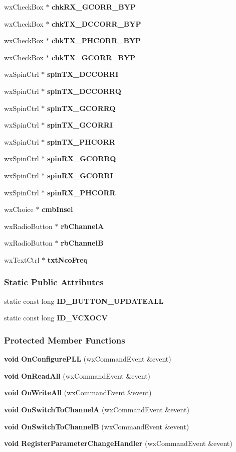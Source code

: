 \begin{DoxyCompactItemize}
\item 
wx\+Check\+Box $\ast$ {\bf chk\+R\+X\+\_\+\+G\+C\+O\+R\+R\+\_\+\+B\+YP}
\item 
wx\+Check\+Box $\ast$ {\bf chk\+T\+X\+\_\+\+D\+C\+C\+O\+R\+R\+\_\+\+B\+YP}
\item 
wx\+Check\+Box $\ast$ {\bf chk\+T\+X\+\_\+\+P\+H\+C\+O\+R\+R\+\_\+\+B\+YP}
\item 
wx\+Check\+Box $\ast$ {\bf chk\+T\+X\+\_\+\+G\+C\+O\+R\+R\+\_\+\+B\+YP}
\item 
wx\+Spin\+Ctrl $\ast$ {\bf spin\+T\+X\+\_\+\+D\+C\+C\+O\+R\+RI}
\item 
wx\+Spin\+Ctrl $\ast$ {\bf spin\+T\+X\+\_\+\+D\+C\+C\+O\+R\+RQ}
\item 
wx\+Spin\+Ctrl $\ast$ {\bf spin\+T\+X\+\_\+\+G\+C\+O\+R\+RQ}
\item 
wx\+Spin\+Ctrl $\ast$ {\bf spin\+T\+X\+\_\+\+G\+C\+O\+R\+RI}
\item 
wx\+Spin\+Ctrl $\ast$ {\bf spin\+T\+X\+\_\+\+P\+H\+C\+O\+RR}
\item 
wx\+Spin\+Ctrl $\ast$ {\bf spin\+R\+X\+\_\+\+G\+C\+O\+R\+RQ}
\item 
wx\+Spin\+Ctrl $\ast$ {\bf spin\+R\+X\+\_\+\+G\+C\+O\+R\+RI}
\item 
wx\+Spin\+Ctrl $\ast$ {\bf spin\+R\+X\+\_\+\+P\+H\+C\+O\+RR}
\item 
wx\+Choice $\ast$ {\bf cmb\+Insel}
\item 
wx\+Radio\+Button $\ast$ {\bf rb\+ChannelA}
\item 
wx\+Radio\+Button $\ast$ {\bf rb\+ChannelB}
\item 
wx\+Text\+Ctrl $\ast$ {\bf txt\+Nco\+Freq}
\end{DoxyCompactItemize}
\subsubsection*{Static Public Attributes}
\begin{DoxyCompactItemize}
\item 
static const long {\bf I\+D\+\_\+\+B\+U\+T\+T\+O\+N\+\_\+\+U\+P\+D\+A\+T\+E\+A\+LL}
\item 
static const long {\bf I\+D\+\_\+\+V\+C\+X\+O\+CV}
\end{DoxyCompactItemize}
\subsubsection*{Protected Member Functions}
\begin{DoxyCompactItemize}
\item 
{\bf void} {\bf On\+Configure\+P\+LL} (wx\+Command\+Event \&event)
\item 
{\bf void} {\bf On\+Read\+All} (wx\+Command\+Event \&event)
\item 
{\bf void} {\bf On\+Write\+All} (wx\+Command\+Event \&event)
\item 
{\bf void} {\bf On\+Switch\+To\+ChannelA} (wx\+Command\+Event \&event)
\item 
{\bf void} {\bf On\+Switch\+To\+ChannelB} (wx\+Command\+Event \&event)
\item 
{\bf void} {\bf Register\+Parameter\+Change\+Handler} (wx\+Command\+Event \&event)
\end{DoxyCompactItemize}
